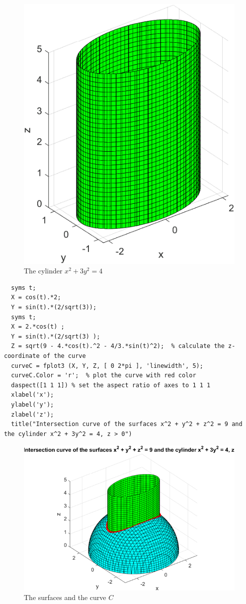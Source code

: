 \begin{figure}[H]
  \centering
  \includegraphics[width=12cm]{graphics/3a2.png}
  \caption{The cylinder $x^2 + 3y^2 = 4$}
\end{figure}

\begin{lstlisting}[style=Matlab-editor]
  % Draw the curve C as the interection of 2 surfaces:
  syms t;
  X = cos(t).*2;
  Y = sin(t).*(2/sqrt(3));
  syms t;
  X = 2.*cos(t) ;
  Y = sin(t).*(2/sqrt(3) );
  Z = sqrt(9 - 4.*cos(t).^2 - 4/3.*sin(t)^2);  % calculate the z-coordinate of the curve
  curveC = fplot3 (X, Y, Z, [ 0 2*pi ], 'linewidth', 5);
  curveC.Color = 'r';  % plot the curve with red color
  daspect([1 1 1]) % set the aspect ratio of axes to 1 1 1
  xlabel('x');
  ylabel('y');
  zlabel('z');
  title("Intersection curve of the surfaces x^2 + y^2 + z^2 = 9 and the cylinder x^2 + 3y^2 = 4, z > 0")   
\end{lstlisting}

\begin{figure}[H]
  \centering
  \includegraphics[width=12cm]{graphics/3a3.png}
  \caption{The surfaces and the curve $C$}
\end{figure}

